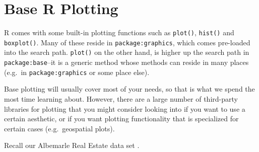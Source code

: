 \documentclass[
  12pt,
  krantz2]{krantz}
\makeatletter
\newenvironment{Shaded}{\begin{snugshade}}{\end{snugshade}}
\newcommand{\AttributeTok}[1]{\textcolor[rgb]{0.61,0.61,0.61}{#1}}
\newcommand{\DocumentationTok}[1]{\textcolor[rgb]{0.37,0.37,0.37}{\textbf{\textit{#1}}}}
\newcommand{\FunctionTok}[1]{\textcolor[rgb]{0,0,0}{#1}}
\newcommand{\NormalTok}[1]{#1}
\newcommand{\OtherTok}[1]{\textcolor[rgb]{0.37,0.37,0.37}{#1}}
\newcommand{\StringTok}[1]{\textcolor[rgb]{0.5,0.5,0.5}{#1}}
\newenvironment{kframe}{%
\medskip{}
\setlength{\fboxsep}{.8em}
 \def\at@end@of@kframe{}%
 \ifinner\ifhmode%
  \def\at@end@of@kframe{\end{minipage}}%
  \begin{minipage}{\columnwidth}%
 \fi\fi%
 \def\FrameCommand##1{\hskip\@totalleftmargin \hskip-\fboxsep
 \colorbox{shadecolor}{##1}\hskip-\fboxsep
     \hskip-\linewidth \hskip-\@totalleftmargin \hskip\columnwidth}%
 \MakeFramed {\advance\hsize-\width
   \@totalleftmargin\z@ \linewidth\hsize
   \@setminipage}}%
 {\par\unskip\endMakeFramed%
 \at@end@of@kframe}
\renewenvironment{Shaded}{\begin{kframe}}{\end{kframe}}
\makeatother
\begin{document}
\hypertarget{base-r-plotting}{%
\section{Base R Plotting}\label{base-r-plotting}}

R comes with some built-in plotting functions such as \texttt{plot()}, \texttt{hist()} and \texttt{boxplot()}. Many of these reside in \texttt{package:graphics}, which comes pre-loaded into the search path. \texttt{plot()} on the other hand, is higher up the search path in \texttt{package:base}--it is a generic method whose methods can reside in many places (e.g.~in \texttt{package:graphics} or some place else).

Base plotting will usually cover most of your needs, so that is what we spend the most time learning about. However, there are a large number of third-party libraries for plotting that you might consider looking into if you want to use a certain aesthetic, or if you want plotting functionality that is specialized for certain cases (e.g.~geospatial plots).

Recall our Albemarle Real Estate data set \citep{albemarle_county_gis_web} \citep{clay_ford}.

\begin{Shaded}
\end{Shaded}
\end{document}

